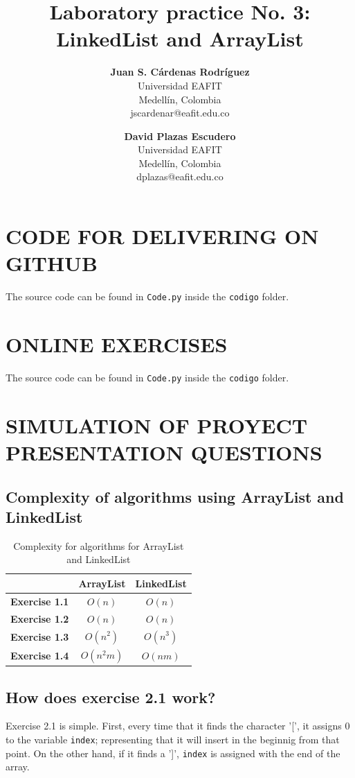 \documentclass[a4paper,12pt]{article}
\title{\color{Eblue}\textbf{Laboratory practice No. 3: LinkedList and ArrayList}}
\author{
  \textbf{Juan S. Cárdenas Rodríguez}\\
  Universidad EAFIT\\
  Medellín, Colombia\\
  jscardenar@eafit.edu.co
\and
  \textbf{David Plazas Escudero}\\
  Universidad EAFIT\\
  Medellín, Colombia\\
  dplazas@eafit.edu.co
}
\begin{document}
  \maketitle
  \thispagestyle{fancy}

  \section{CODE FOR DELIVERING ON GITHUB}
  The source code can be found in \texttt{Code.py} inside the \texttt{codigo} folder.

  \section{ONLINE EXERCISES}
  The source code can be found in \texttt{Code.py} inside the \texttt{codigo} folder.

  \section{SIMULATION OF PROYECT PRESENTATION QUESTIONS}
    \subsection{Complexity of algorithms using ArrayList and LinkedList}
      \begin{table}[H]
      \centering
      \caption{Complexity for algorithms for ArrayList and LinkedList}
        \begin{tabular}{ccc}
        \hline
          \textbf{}             & \textbf{ArrayList} & \textbf{LinkedList} \\ \hline
          \textbf{Exercise 1.1} & $O(n)$             & $O(n)$              \\
          \textbf{Exercise 1.2} & $O(n)$             & $O(n)$              \\
          \textbf{Exercise 1.3} & $O(n^2)$           & $O(n^3)$            \\
          \textbf{Exercise 1.4} & $O(n^2m)$          & $O(nm)$             \\ \hline
        \end{tabular}
      \end{table}
    \subsection{How does exercise 2.1 work?}
      Exercise 2.1 is simple. First, every time that it finds the character '[', it assigns 0
      to the variable \texttt{index}; representing that it will insert in the beginnig from that point.
      On the other hand, if it finds a ']', \texttt{index} is assigned with the end of the array.
\end{document}

